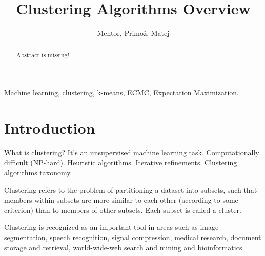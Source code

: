 \documentclass[conference]{IEEEtran}
\begin{document}
\title{Clustering Algorithms Overview}
\author{Mentor, Primož, Matej}
\maketitle

\begin{abstract}
Abstract is missing!
\end{abstract}

\begin{IEEEkeywords}
Machine learning, clustering, k-means, ECMC, Expectation Maximization.
\end{IEEEkeywords}

\section{Introduction}
What is clustering? It's an unsupervised machine learning task. Computationally difficult
(NP-hard). Heuristic algorithms. Iterative refinements. Clustering algorithms taxonomy.

Clustering refers to the problem of partitioning a dataset into subsets, such that members
within subsets are more similar to each other (according to some criterion) than to members
of other subsets. Each subset is called a cluster.

Clustering is recognized as an important tool in areas such as image segmentation,
speech recognition, signal compression, medical research, document storage and retrieval,
world-wide-web search and mining and bioinformatics.

\end{document}
